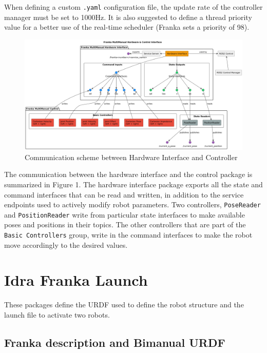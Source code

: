 \documentclass{article}
\begin{document}
When defining a custom \texttt{.yaml} configuration file, the update rate of the controller manager must be set to 1000Hz. It is also suggested to define a thread priority value for a better use of the real-time scheduler (Franka sets a priority of 98). \\

\begin{figure}[htbp]
    \centering
    \includegraphics[width=\linewidth]{images/diagram.png}
    \caption{Communication scheme between Hardware Interface and Controller}
    \label{Figure:1}
\end{figure}

The communication between the hardware interface and the control package is summarized in Figure 1. The hardware interface package exports all the state and command interfaces that can be read and written, in addition to the service endpoints used to actively modify robot parameters. Two controllers, \texttt{PoseReader} and \texttt{PositionReader} write from particular state interfaces to make available poses and positions in their topics. The other controllers that are part of the \texttt{Basic Controllers} group, write in the command interfaces to make the robot move accordingly to the desired values.

\section{Idra Franka Launch}

These packages define the URDF used to define the robot structure and the launch file to activate two robots.

\subsection{Franka description and Bimanual URDF}
\end{document}
